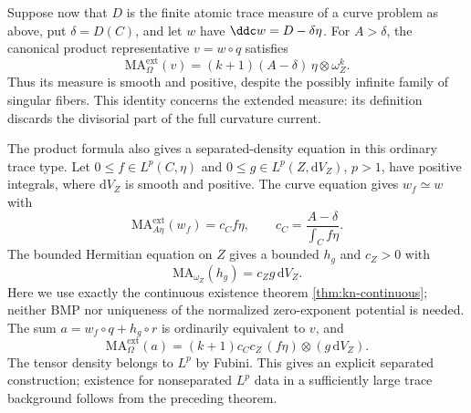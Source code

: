 Suppose now that $D$ is the finite atomic trace measure of a curve problem as above, put $\delta=D(C)$, and let $w$ have $\ddc w=D-\delta\eta$. For $A>\delta$, the canonical product representative $v=w\circ q$ satisfies
\begin{equation}\label{eq:product-trace-smooth-measure}
 \mathrm{MA}^{\mathrm{ext}}_\Omega(v)
       =(k+1)(A-\delta)\,\eta\otimes\omega_Z^k.
\end{equation}
Thus its measure is smooth and positive, despite the possibly infinite family of singular fibers. This identity concerns the extended measure: its definition discards the divisorial part of the full curvature current.

The product formula also gives a separated-density equation in this ordinary trace type. Let $0\leq f\in L^p(C,\eta)$ and $0\leq g\in L^p(Z,\mathrm{d}V_Z)$, $p>1$, have positive integrals, where $\mathrm{d}V_Z$ is smooth and positive. The curve equation gives $w_f\simeq w$ with
\[
 \mathrm{MA}^{\mathrm{ext}}_{A\eta}(w_f)=c_C f\eta,
 \qquad c_C=\frac{A-\delta}{\int_Cf\eta}.
\]
The bounded Hermitian equation on $Z$ gives a bounded $h_g$ and $c_Z>0$ with
\[
 \mathrm{MA}_{\omega_Z}(h_g)=c_Zg\,\mathrm{d}V_Z.
\]
Here we use exactly the continuous existence theorem \cref{thm:kn-continuous}; neither BMP nor uniqueness of the normalized zero-exponent potential is needed. The sum $a=w_f\circ q+h_g\circ r$ is ordinarily equivalent to $v$, and
\[
 \mathrm{MA}^{\mathrm{ext}}_\Omega(a)
       =(k+1)c_Cc_Z\,(f\eta)\otimes(g\,\mathrm{d}V_Z).
\]
The tensor density belongs to $L^p$ by Fubini. This gives an explicit separated construction; existence for nonseparated $L^p$ data in a sufficiently large trace background follows from the preceding theorem.

